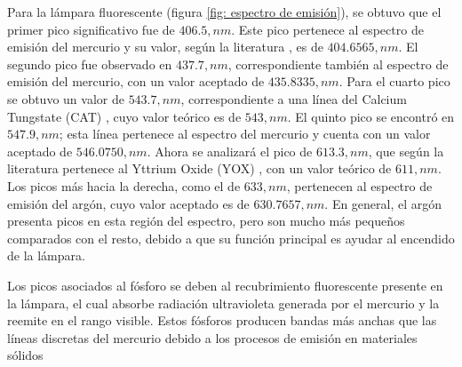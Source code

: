\documentclass[twocolumn]{article}
\begin{document}
Para la lámpara fluorescente (figura \ref{fig: espectro de emisión}), se obtuvo que el primer pico significativo fue de $406.5,nm$. Este pico pertenece al espectro de emisión del mercurio y su valor, según la literatura \cite{HG}, es de $404.6565,nm$. El segundo pico fue observado en $437.7,nm$, correspondiente también al espectro de emisión del mercurio, con un valor aceptado de $435.8335,nm$. Para el cuarto pico se obtuvo un valor de $543.7,nm$, correspondiente a una línea del Calcium Tungstate (CAT) \cite{Lamptech2011}, cuyo valor teórico es de $543,nm$. El quinto pico se encontró en $547.9,nm$; esta línea pertenece al espectro del mercurio y cuenta con un valor aceptado de $546.0750,nm$. Ahora se analizará el pico de $613.3,nm$, que según la literatura pertenece al Yttrium Oxide (YOX) \cite{Lamptech2011}, con un valor teórico de $611,nm$. Los picos más hacia la derecha, como el de $633,nm$, pertenecen al espectro de emisión del argón, cuyo valor aceptado es de $630.7657,nm$. En general, el argón presenta picos en esta región del espectro, pero son mucho más pequeños comparados con el resto, debido a que su función principal es ayudar al encendido de la lámpara.

Los picos asociados al fósforo se deben al recubrimiento fluorescente presente en la lámpara, el cual absorbe radiación ultravioleta generada por el mercurio y la reemite en el rango visible. Estos fósforos producen bandas más anchas que las líneas discretas del mercurio debido a los procesos de emisión en materiales sólidos \cite{CAMEOFluorescent}
\end{document}
